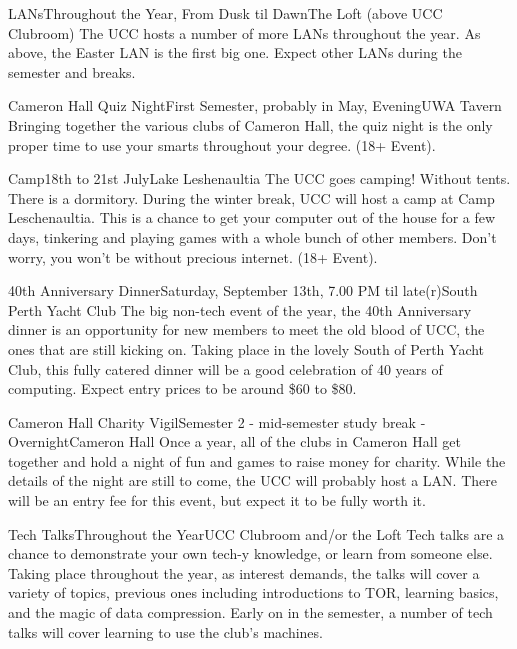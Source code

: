 \begin{event}{LANs}{Throughout the Year, From Dusk til Dawn}{The Loft (above UCC Clubroom)}
The UCC hosts a number of more LANs throughout the year. As above, the Easter LAN is the first big one. Expect other LANs during the semester and breaks.
\end{event}

\begin{event}{Cameron Hall Quiz Night}{First Semester, probably in May, Evening}{UWA Tavern}
Bringing together the various clubs of Cameron Hall, the quiz night is the only proper time to use your smarts throughout your degree.  (18+ Event).
\end{event}

\begin{event}{Camp}{18th to 21st July}{Lake Leshenaultia}
The UCC goes camping! Without tents. There is a dormitory. During the winter break, UCC will host a camp at Camp Leschenaultia. This is a chance to get your computer out of the house for a few days, tinkering and playing games with a whole bunch of other members. Don't worry, you won't be without precious internet. (18+ Event).
\end{event}

\begin{event}{40th Anniversary Dinner}{Saturday, September 13th, 7.00 PM til late(r)}{South Perth Yacht Club}
The big non-tech event of the year, the 40th Anniversary dinner is an opportunity for new members to meet the old blood of UCC, the ones that are still kicking on. Taking place in the lovely South of Perth Yacht Club, this fully catered dinner will be a good celebration of 40 years of computing. Expect entry prices to be around \$60 to \$80.
\end{event}

\begin{event}{Cameron Hall Charity Vigil}{Semester 2 - mid-semester study break - Overnight}{Cameron Hall}
Once a year, all of the clubs in Cameron Hall get together and hold a night of fun and games to raise money for charity. While the details of the night are still to come, the UCC will probably host a LAN. There will be an entry fee for this event, but expect it to be fully worth it.
\end{event}

\begin{event}{Tech Talks}{Throughout the Year}{UCC Clubroom and/or the Loft}
Tech talks are a chance to demonstrate your own tech-y knowledge, or learn from someone else. Taking place throughout the year, as interest demands, the talks will cover a variety of topics, previous ones including introductions to TOR, learning basics, and the magic of data compression. Early on in the semester, a number of tech talks will cover learning to use the club's machines.
\end{event}

